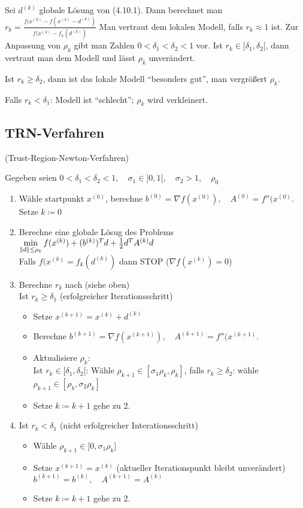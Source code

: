 \documentclass[ngerman,halfparskip]{scrartcl}
\DeclarePairedDelimiter{\norm}{\lVert}{\rVert}
\theoremstyle{definition}
\begin{document}
Sei $d^{(k)}$ globale Lösung von (4.10.1). Dann berechnet man\\
$r_k=\frac{f(x^{(k)}-f(x^{(k)}-d^{(k)})}{f(x^{(k)}-f_k(d^{(k)})}$ Man vertraut dem lokalen Modell, falls $r_k \approx 1$ ist. Zur Anpassung von $\rho_k$ gibt man Zahlen $0<\delta_1 < \delta_2 <1$ vor. Ist $r_k\in[\delta_1,\delta_2[$, dann vertraut man dem Modell und lässt $\rho_k$ unverändert.

Ist $r_k \geq \delta_2$, dann ist das lokale Modell "`besonders gut"', man vergrößert $\rho_k$.

Falls $r_k<\delta_1$: Modell ist "`schlecht"'; $\rho_k$ wird verkleinert.

\subsection*{TRN-Verfahren} (Trust-Region-Newton-Verfahren)

Gegeben seien $0<\delta_1 < \delta_2 <1, \quad \sigma_1\in]0,1[, \quad \sigma_2>1, \quad \rho_0$
\begin{enumerate}
\item Wähle startpunkt $x^{(0)}$, berechne $b^ {(0)}=\nabla f(x^{(0)}),\quad A^{(0)}=f''(x^{(0)}$. Setze $k\coloneqq 0$
\item Berechne eine globale Lösug des Problems\\
$\min\limits_{\norm{d}\leq \rho_k}f(x^{(k)})+(b^{(k)})^Td+\frac 12 d^TA^{(k)}d$\\
Falls $f(x^{(k)}=f_k(d^{(k)})$ dann STOP ($\nabla f(x^{(k)})=0$)
\item Berechne $r_k$ nach (siehe oben)\\
Ist $r_k\geq \delta _1$ (erfolgreicher Iterationsschritt)
\begin{itemize}
\item Setze $x^{(k+1)}=x^{(k)}+d^{(k)}$
\item Berechne $b^ {(k+1)}=\nabla f(x^{(k+1)}),\quad A^{(k+1)}=f''(x^{(k+1)}$.
\item Aktualisiere $\rho_k$:\\
Ist $r_k\in[\delta_1,\delta_2[$: Wähle $\rho_{k+1}\in[\sigma_1\rho_k,\rho_k]$, falls $r_k\geq \delta_2$: wähle $\rho_{k+1}
\in [\rho_k,\sigma_2\rho_k]$
\item Setze $k\coloneqq k+1$ gehe zu 2.
\end{itemize}
\item Ist $r_k<\delta_1$ (nicht erfolgreicher Interationsschritt)
\begin{itemize}
\item Wähle $\rho_{k+1}\in ]0,\sigma_1\rho_k]$
\item Setze $x^{(k+1)}=x^{(k)}$ (aktueller Iterationspunkt bleibt unverändert) $b^{(k+1)}=b^{(k)}, \quad A^{(k+1)}=A^{(k)}$
\item Setze $k\coloneqq k+1$ gehe zu 2.
\end{itemize}
\end{enumerate}
\end{document}

